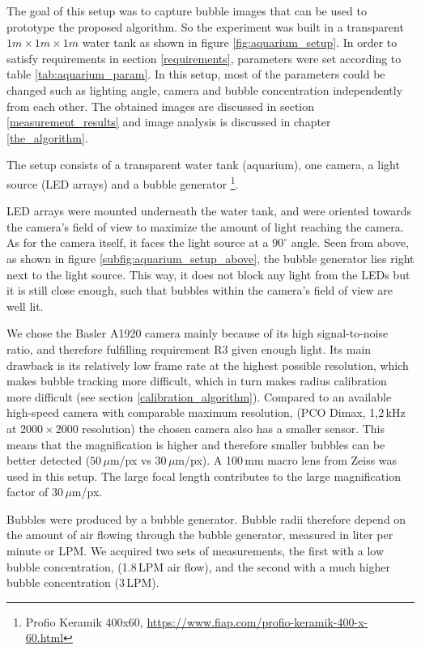 		The goal of this setup was to capture bubble images that can be used to prototype the proposed algorithm. So the experiment was built in a transparent $1m \times 1m \times 1m$ water tank as shown in figure \ref{fig:aquarium_setup}. In order to satisfy requirements in section \ref{requirements}, parameters were set according to table \ref{tab:aquarium_param}. 
		 In this setup, most of the parameters could be changed such as lighting angle, camera and bubble concentration independently from each other. The obtained images are discussed in section \ref{measurement_results} and image analysis is discussed in chapter \ref{the_algorithm}.
		 
		 The setup consists of a transparent water tank (aquarium), one camera, a light source (LED arrays) and a bubble generator \footnote{Profio Keramik 400x60, \url{https://www.fiap.com/profio-keramik-400-x-60.html}}. 
		 
		 LED arrays were mounted underneath the water tank, and were oriented towards the camera's field of view to maximize the amount of light reaching the camera. As for the camera itself, it faces the light source at a $90^\circ$ angle. 
		 Seen from above, as shown in figure \ref{subfig:aquarium_setup_above}, the bubble generator lies right next to the light source. This way, it does not block any light from the LEDs but it is still close enough, such that bubbles within the camera's field of view are well lit. 
		
		We chose the Basler A1920 camera mainly because of its high signal-to-noise ratio, and therefore fulfilling requirement R3 given enough light. Its main drawback is its relatively low frame rate at the highest possible resolution, which makes bubble tracking more difficult, which in turn makes radius calibration more difficult (see section \ref{calibration_algorithm}). Compared to an available high-speed camera with comparable maximum resolution, (PCO Dimax, 1,2\,kHz at $2000 \times 2000$ resolution) the chosen camera also has a smaller sensor. This means that the magnification is higher and therefore smaller bubbles can be better detected ($50 \, \mu$m/px vs $30 \, \mu $m/px). A 100\,mm macro lens from Zeiss was used in this setup. The large focal length contributes to the large magnification factor of $30 \, \mu$m/px.
	
	Bubbles were produced by a bubble generator. Bubble radii therefore depend on the amount of air flowing through the bubble generator, measured in liter per minute or LPM. We acquired two sets of measurements, the first with a low bubble concentration, (1.8\,LPM air flow), and the second with a much higher bubble concentration (3\,LPM). 
		
